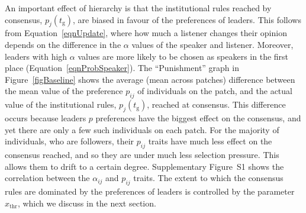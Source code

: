 \documentclass{rstb}
\begin{document}
\begin{linenumbers}
An important effect of hierarchy is that the institutional rules reached by consensus, $p_j(t_\mathrm{g})$, are biased in favour of the preferences of leaders. This follows from Equation~\ref{eqnUpdate}, where how much a listener changes their opinion depends on the difference in the $\alpha$ values of the speaker and listener. Moreover, leaders with high $\alpha$ values are more likely to be chosen as speakers in the first place (Equation~\ref{eqnProbSpeaker}). The ``Punishment'' graph in Figure~\ref{figBaseline} shows the average (mean across patches) difference between the mean value of the preference $p_{ij}$ of individuals on the patch, and the actual value of the institutional rules, $p_j(t_\mathrm{g})$, reached at consensus. This difference occurs because leaders $p$ preferences have the biggest effect on the consensus, and yet there are only a few such individuals on each patch. For the majority of individuals, who are followers, their $p_{ij}$ traits have much less effect on the consensus reached, and so they are under much less selection pressure. This allows them to drift to a certain degree. Supplementary Figure~S1 shows the correlation between the $\alpha_{ij}$ and $p_{ij}$ traits. The extent to which the consensus rules are dominated by the preferences of leaders is controlled by the parameter $x_\mathrm{thr}$, which we discuss in the next section. 


\end{linenumbers}
\end{document}
